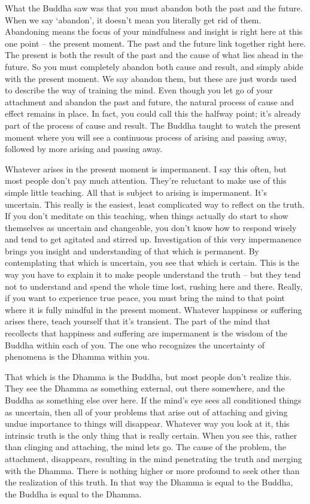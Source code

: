 What the Buddha saw was that you must abandon both the past and the future. When we say `abandon', it doesn't mean you literally get rid of them. Abandoning means the focus of your mindfulness and insight is right here at this one point -- the present moment. The past and the future link together right here. The present is both the result of the past and the cause of what lies ahead in the future. So you must completely abandon both cause and result, and simply abide with the present moment. We say abandon them, but these are just words used to describe the way of training the mind. Even though you let go of your attachment and abandon the past and future, the natural process of cause and effect remains in place. In fact, you could call this the halfway point; it's already part of the process of cause and result. The Buddha taught to watch the present moment where you will see a continuous process of arising and passing away, followed by more arising and passing away.

Whatever arises in the present moment is impermanent. I say this often, but most people don't pay much attention. They're reluctant to make use of this simple little teaching. All that is subject to arising is impermanent. It's uncertain. This really is the easiest, least complicated way to reflect on the truth. If you don't meditate on this teaching, when things actually do start to show themselves as uncertain and changeable, you don't know how to respond wisely and tend to get agitated and stirred up. Investigation of this very impermanence brings you insight and understanding of that which is permanent. By contemplating that which is uncertain, you see that which is certain. This is the way you have to explain it to make people understand the truth -- but they tend not to understand and spend the whole time lost, rushing here and there. Really, if you want to experience true peace, you must bring the mind to that point where it is fully mindful in the present moment. Whatever happiness or suffering arises there, teach yourself that it's transient. The part of the mind that recollects that happiness and suffering are impermanent is the wisdom of the Buddha within each of you. The one who recognizes the uncertainty of phenomena is the Dhamma within you.

That which is the Dhamma is the Buddha, but most people don't realize this. They see the Dhamma as something external, out there somewhere, and the Buddha as something else over here. If the mind's eye sees all conditioned things as uncertain, then all of your problems that arise out of attaching and giving undue importance to things will disappear. Whatever way you look at it, this intrinsic truth is the only thing that is really certain. When you see this, rather than clinging and attaching, the mind lets go. The cause of the problem, the attachment, disappears, resulting in the mind penetrating the truth and merging with the Dhamma. There is nothing higher or more profound to seek other than the realization of this truth. In that way the Dhamma is equal to the Buddha, the Buddha is equal to the Dhamma.


